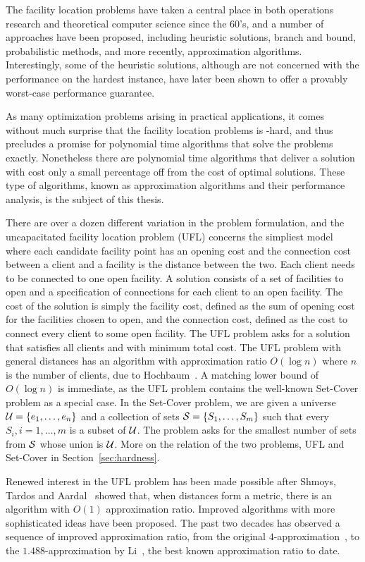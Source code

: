 \documentclass[oneside,final]{ucr}
\begin{document}
The facility location problems have taken a central place in
both operations research and theoretical computer science
since the 60's, and a number of approaches have been
proposed, including heuristic solutions, branch and bound,
probabilistic methods, and more recently, approximation
algorithms. Interestingly, some of the heuristic solutions,
although are not concerned with the performance on the
hardest instance, have later been shown to offer a provably
worst-case performance guarantee.

As many optimization problems arising in practical
applications, it comes without much surprise that the
facility location problems is \NP-hard, and thus precludes a
promise for polynomial time algorithms that solve the
problems exactly. Nonetheless there are polynomial time
algorithms that deliver a solution with cost only a small
percentage off from the cost of optimal solutions. These
type of algorithms, known as approximation algorithms and
their performance analysis, is the subject of this thesis.

There are over a dozen different variation in the problem
formulation, and the uncapacitated facility location problem
(UFL) concerns the simpliest model where each candidate
facility point has an opening cost and the connection cost
between a client and a facility is the distance between the
two. Each client needs to be connected to one open
facility. A solution consists of a set of facilities to open
and a specification of connections for each client to an
open facility. The cost of the solution is simply the
facility cost, defined as the sum of opening cost for the
facilities chosen to open, and the connection cost, defined
as the cost to connect every client to some open
facility. The UFL problem asks for a solution that satisfies
all clients and with minimum total cost. The UFL problem
with general distances has an algorithm with approximation
ratio $O(\log n)$ where $n$ is the number of clients, due to
Hochbaum~\cite{Hochbaum82}. A matching lower bound of
$O(\log n)$ is immediate, as the UFL problem contains the
well-known Set-Cover problem as a special case. In the
Set-Cover problem, we are given a universe $\calU =
\{e_1,\ldots,e_n\}$ and a collection of sets $\calS =
\{S_1,\ldots,S_m\}$ such that every $S_i, i=1,\ldots,m$ is a
subset of $\calU$. The problem asks for the smallest number
of sets from $\calS$ whose union is $\calU$. More on the
relation of the two problems, UFL and Set-Cover in
Section~\ref{sec:hardness}.

Renewed interest in the UFL problem has been made possible
after Shmoys, Tardos and Aardal~\cite{ShmoysTA97} showed
that, when distances form a metric, there is an algorithm
with $O(1)$ approximation ratio. Improved algorithms with
more sophisticated ideas have been proposed. The past two
decades has observed a sequence of improved approximation
ratio, from the original
$4$-approximation~\cite{ShmoysTA97}, to the
$1.488$-approximation by Li~\cite{Li11}, the best known
approximation ratio to date.
\end{document}
